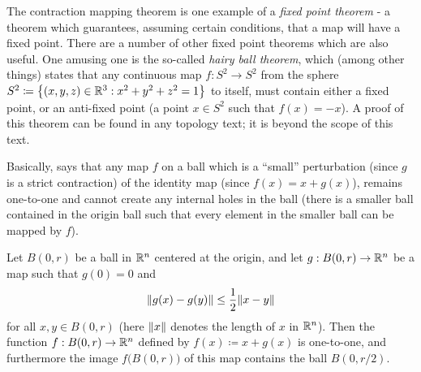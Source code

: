 \begin{rmk}\label{ii:6.6.5}
  The contraction mapping theorem is one example of a \emph{fixed point theorem}
  - a theorem which guarantees, assuming certain conditions, that a map will have a fixed point.
  There are a number of other fixed point theorems which are also useful.
  One amusing one is the so-called \emph{hairy ball theorem}, which (among other things) states that any continuous map \(f : S^2 \to S^2\) from the sphere \(S^2 \coloneqq \set{(x, y, z) \in \R^3 : x^2 + y^2 + z^2 = 1}\) to itself, must contain either a fixed point, or an anti-fixed point
  (a point \(x \in S^2\) such that \(f(x) = -x\)).
  A proof of this theorem can be found in any topology text;
  it is beyond the scope of this text.
\end{rmk}

\begin{note}
  Basically,  says that any map \(f\) on a ball which is a ``small'' perturbation (since \(g\) is a strict contraction) of the identity map (since \(f(x) = x + g(x)\)), remains one-to-one and cannot create any internal holes in the ball
  (there is a smaller ball contained in the origin ball such that every element in the smaller ball can be mapped by \(f\)).
\end{note}

\begin{lem}\label{ii:6.6.6}
  Let \(B(0, r)\) be a ball in \(\R^n\) centered at the origin, and let \(g : B(0, r) \to \R^n\) be a map such that \(g(0) = 0\) and
  \[
    \norm*{g(x) - g(y)} \leq \dfrac{1}{2} \norm*{x - y}
  \]
  for all \(x, y \in B(0, r)\)
  (here \(\norm*{x}\) denotes the length of \(x\) in \(\R^n\)).
  Then the function \(f : B(0, r) \to \R^n\) defined by \(f(x) \coloneqq x + g(x)\) is one-to-one, and furthermore the image \(f\big(B(0, r)\big)\) of this map contains the ball \(B(0, r / 2)\).
\end{lem}

